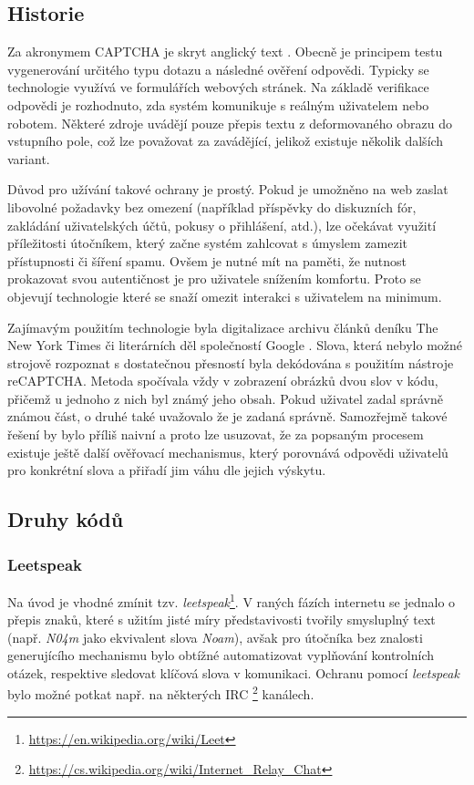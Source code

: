 \documentclass[
  field=ainfp,
  master=true,
  biblatex,
  sourcecodes=false,
  theorems=false,
  glossaries,
  index
]{kidiplom}
\begin{document}
\subsection{Historie}
Za akronymem CAPTCHA je skryt anglický text . Obecně je principem testu vygenerování určitého typu dotazu a následné ověření odpovědi. Typicky se technologie využívá ve formulářích webových stránek. Na základě verifikace odpovědi je rozhodnuto, zda systém komunikuje s reálným uživatelem nebo robotem. Některé zdroje \cite{wiki:CAPTCHA} uvádějí pouze přepis textu z deformovaného obrazu do vstupního pole, což lze považovat za zavádějící, jelikož existuje několik dalších  variant. 

Důvod pro užívání takové ochrany je prostý. Pokud je umožněno na web zaslat libovolné požadavky bez omezení (například příspěvky do diskuzních fór, zakládání uživatelských účtů, pokusy o přihlášení, atd.), lze očekávat využití příležitosti útočníkem, který začne systém zahlcovat s úmyslem zamezit přístupnosti či šíření spamu. Ovšem je nutné mít na paměti, že nutnost prokazovat svou autentičnost je pro uživatele snížením komfortu. Proto se objevují technologie které se snaží omezit interakci s uživatelem na minimum. 

Zajímavým použitím technologie byla digitalizace archivu článků deníku The New York Times či literárních děl společností Google \cite{web:techcrunch}. Slova, která nebylo možné strojově rozpoznat s dostatečnou přesností byla dekódována s použitím nástroje reCAPTCHA. Metoda spočívala vždy v zobrazení obrázků dvou slov v kódu, přičemž u jednoho z nich byl známý jeho obsah. Pokud uživatel zadal správně známou část, o druhé také uvažovalo že je zadaná správně. Samozřejmě takové řešení by bylo příliš naivní a proto lze usuzovat, že za popsaným procesem existuje ještě další ověřovací mechanismus, který porovnává odpovědi uživatelů pro konkrétní slova a přiřadí jim váhu dle jejich výskytu. 
\subsection{Druhy kódů}
 
\subsubsection*{Leetspeak} 
Na úvod je vhodné zmínit tzv. \textit{leetspeak}\footnote{\url{https://en.wikipedia.org/wiki/Leet}}. V raných fázích internetu se jednalo o přepis znaků, které s užitím jisté míry představivosti tvořily smysluplný text (např. \textit{N04m} jako ekvivalent slova \textit{Noam}), avšak pro útočníka bez znalosti generujícího mechanismu bylo obtížné automatizovat vyplňování kontrolních otázek, respektive sledovat klíčová slova v komunikaci. Ochranu pomocí \textit{leetspeak} bylo možné potkat např. na některých IRC \footnote{\url{https://cs.wikipedia.org/wiki/Internet\_Relay\_Chat}} kanálech.
 
\end{document}
